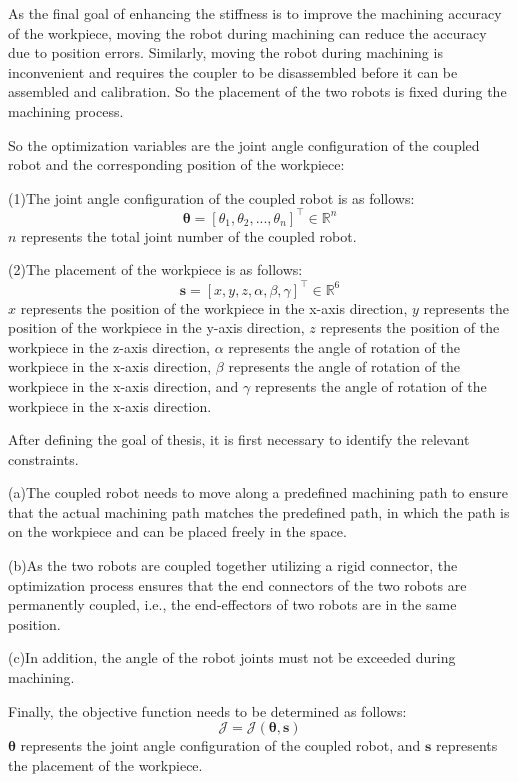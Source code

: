 As the final goal of enhancing the stiffness is to improve the machining accuracy of the workpiece, moving the robot during machining can reduce the accuracy due to position errors. Similarly, moving the robot during machining is inconvenient and requires the coupler to be disassembled before it can be assembled and calibration. So the placement of the two robots is fixed during the machining process.\par
So the optimization variables are the joint angle configuration of the coupled robot and the corresponding position of the workpiece:\par
(1)The joint angle configuration of the coupled robot is as follows: 
\begin{equation}
  \boldsymbol{\theta} =  \left[ \theta_{1},\theta_{2},...,\theta_{n} \right]^\top \in \mathbb{R}^{n} 
\end{equation}
$n$ represents the total joint number of the coupled robot.\par
(2)The placement of the workpiece is as follows:
\begin{equation}
\boldsymbol{s} =  \left[x,y,z,\alpha,\beta,\gamma\right]^\top \in \mathbb{R}^{6}
\end{equation}
$x$ represents the position of the workpiece in the x-axis direction, $y$ represents the position of the workpiece in the y-axis direction, $z$ represents the position of the workpiece in the z-axis direction, $\alpha$ represents the angle of rotation of the workpiece in the x-axis direction, $\beta$ represents the angle of rotation of the workpiece in the x-axis direction, and $\gamma$ represents the angle of rotation of the workpiece in the x-axis direction.\par
After defining the goal of thesis, it is first necessary to identify the relevant constraints.\par
(a)The coupled robot needs to move along a predefined machining path to ensure that the actual machining path matches the predefined path, in which the path is on the workpiece and can be placed freely in the space.\par
(b)As the two robots are coupled together utilizing a rigid connector, the optimization process ensures that the end connectors of the two robots are permanently coupled, i.e., the end-effectors of two robots are in the same position.\par
(c)In addition, the angle of the robot joints must not be exceeded during machining.\par
Finally, the objective function needs to be determined as follows:
\begin{equation}
\mathcal{J} = \mathcal{J}\left(\boldsymbol{\theta},\boldsymbol{s}\right)
\end{equation}
$\boldsymbol{\theta}$ represents the joint angle configuration of the coupled robot, and $\boldsymbol{s}$ represents the placement of the workpiece.
